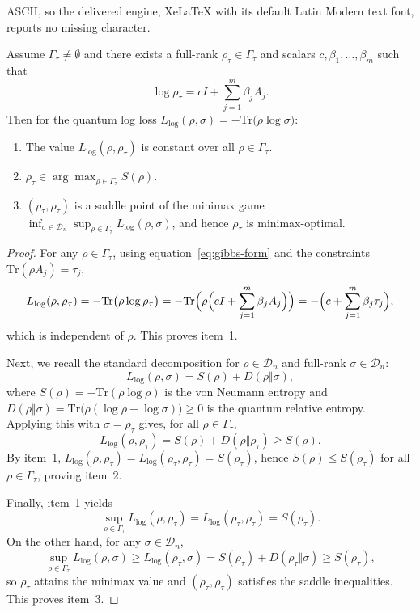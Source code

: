 \documentclass[10pt,a4paper]{amsart}
\def\eqref#1{equation~\ref{#1}}
\begin{document}
ASCII, so the delivered engine, XeLaTeX with its default Latin Modern text font, reports no missing character.
\begin{theorem}
\label{thm:gibbs-equalizer}
Assume $\Gamma_{\tau}\neq\emptyset$ and there exists a full-rank
$\rho_{\tau}\in\Gamma_{\tau}$ and scalars $c,\beta_1,\dots,\beta_m$ such that
\begin{equation}
\log \rho_{\tau}
=
cI+\sum_{j=1}^m \beta_j A_j.
\label{eq:gibbs-form}
\end{equation}
Then for the quantum log loss $L_{\log}(\rho,\sigma)=-\mathrm{Tr}\bigl(\rho\log\sigma\bigr)$:
\begin{enumerate}
\item  The value $L_{\log}(\rho,\rho_{\tau})$ is constant over all
$\rho\in\Gamma_{\tau}$.
\item $\rho_{\tau}\in\arg\max_{\rho\in\Gamma_{\tau}} S(\rho)$.
\item  $(\rho_{\tau},\rho_{\tau})$ is a saddle point of the minimax game
$\inf_{\sigma\in\mathcal{D}_n}\sup_{\rho\in\Gamma_{\tau}} L_{\log}(\rho,\sigma)$, and hence
$\rho_{\tau}$ is minimax-optimal.
\end{enumerate}
\end{theorem}

\begin{proof}
For any $\rho\in\Gamma_{\tau}$, using \eqref{eq:gibbs-form} and the constraints
$\mathrm{Tr}(\rho A_j)=\tau_j$,
\[
L_{\log}(\rho,\rho_{\tau})
=
-\mathrm{Tr}\bigl(\rho\log\rho_{\tau}\bigr)
=
-\mathrm{Tr}\Bigl(\rho\Bigl(cI+\sum_{j=1}^m\beta_j A_j\Bigr)\Bigr)
=
-\Bigl(c+\sum_{j=1}^m\beta_j\tau_j\Bigr),
\]
which is independent of $\rho$. This proves item~1.

Next, we recall the standard decomposition for $\rho\in\mathcal{D}_n$ and full-rank
$\sigma\in\mathcal{D}_n$:
\[
L_{\log}(\rho,\sigma)
=
S(\rho)+D(\rho\Vert\sigma),
\]
where $S(\rho)=-\mathrm{Tr}(\rho\log\rho)$ is the von Neumann entropy and
$D(\rho\Vert\sigma)=\mathrm{Tr}\bigl(\rho(\log\rho-\log\sigma)\bigr)\ge 0$ is the
quantum relative entropy. Applying this with $\sigma=\rho_{\tau}$ gives, for all
$\rho\in\Gamma_{\tau}$,
\[
L_{\log}(\rho,\rho_{\tau})
=
S(\rho)+D(\rho\Vert\rho_{\tau})
\ge
S(\rho).
\]
By item~1, $L_{\log}(\rho,\rho_{\tau})=L_{\log}(\rho_{\tau},\rho_{\tau})=S(\rho_{\tau})$,
hence $S(\rho)\le S(\rho_{\tau})$ for all $\rho\in\Gamma_{\tau}$, proving item~2.

Finally, item~1 yields
\[
\sup_{\rho\in\Gamma_{\tau}} L_{\log}(\rho,\rho_{\tau})
=
L_{\log}(\rho_{\tau},\rho_{\tau})
=
S(\rho_{\tau}).
\]
On the other hand, for any $\sigma\in\mathcal{D}_n$,
\[
\sup_{\rho\in\Gamma_{\tau}} L_{\log}(\rho,\sigma)
\ge
L_{\log}(\rho_{\tau},\sigma)
=
S(\rho_{\tau})+D(\rho_{\tau}\Vert\sigma)
\ge
S(\rho_{\tau}),
\]
so $\rho_{\tau}$ attains the minimax value and $(\rho_{\tau},\rho_{\tau})$ satisfies
the saddle inequalities. This proves item~3.
\end{proof}
\end{document}
